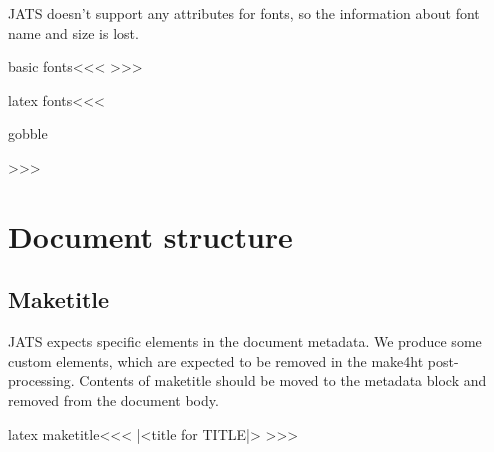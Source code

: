 JATS doesn't support any attributes for fonts, so the information
about font name and size is lost.

\<basic fonts\><<<
>>>

\<latex fonts\><<<
                    {\EndNoFonts\Protect{}}
                    {\EndNoFonts\Protect{}}  
                    {\EndNoFonts\Protect{}}  
                    {\EndNoFonts\Protect{}}
                    {\EndNoFonts\Protect{}}
                    {\EndNoFonts\Protect{}}

   {\:gobble}
   {}

  {}
  {}

  {}
  {}
>>>


\chapter{Document structure}

\section{Maketitle}

JATS expects specific elements in the document metadata. We produce some custom
elements, which are expected to be removed in the make4ht post-processing. Contents
of maketitle should be moved to the metadata block and removed from the document 
body.

\<latex maketitle\><<<
   {\ifvmode \IgnorePar\fi \EndP |<title for TITLE|>%
    }
   {\ifvmode \IgnorePar\fi \EndP {}}
   {\NoFonts\IgnorePar{}\IgnorePar}
   {\IgnoreIndent\EndNoFonts}
>>>

